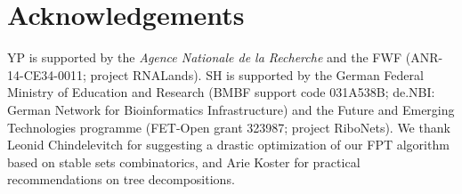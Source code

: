 \documentclass{bioinfo}
\newcommand{\Final}[1]{\begingroup\color{red!70!black}#1\endgroup}
\renewcommand{\Final}[1]{}
\begin{document}

\section*{Acknowledgements}
YP is supported
by the
{\em Agence
  Nationale de la Recherche} and the
FWF (ANR-14-CE34-0011; project RNALands).  SH is supported by the
German Federal Ministry of Education and Research (BMBF support code
031A538B; de.NBI: German Network for Bioinformatics Infrastructure)
and the
Future and Emerging Technologies programme
(FET-Open grant 323987; project RiboNets).
%
We thank Leonid Chindelevitch for suggesting a drastic optimization of our FPT algorithm based on stable sets combinatorics, and Arie Koster for practical recommendations on tree decompositions.



%
%
%
%
%
%
%

\end{document}
